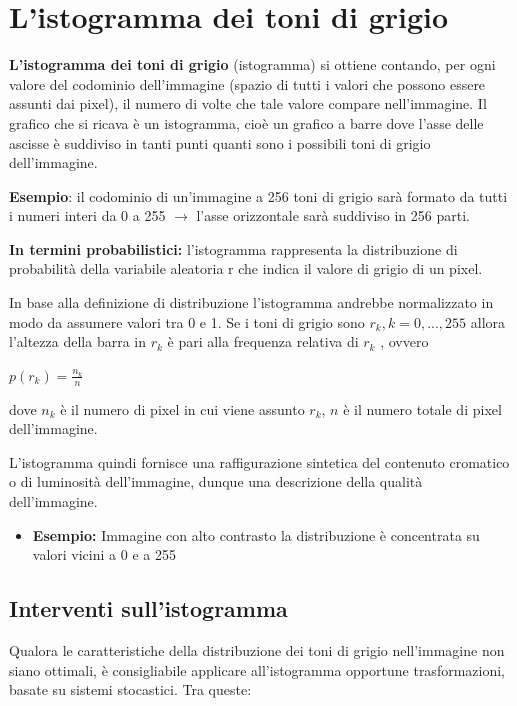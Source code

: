 \section{L’istogramma dei toni di grigio}

\textbf{L’istogramma dei toni di grigio} (istogramma) si ottiene contando, per ogni valore del codominio dell’immagine (spazio di tutti i valori
che possono essere assunti dai pixel), il numero di volte che tale valore compare nell’immagine.
Il grafico che si ricava è un istogramma, cioè un grafico a barre dove l’asse delle ascisse è suddiviso in tanti punti quanti sono i
possibili toni di grigio dell’immagine.

\begin{trivlist}
    \item \textbf{Esempio}: il codominio di un’immagine a 256 toni di grigio sarà formato da tutti i numeri interi da 0 a 255 $\rightarrow$ l’asse orizzontale sarà suddiviso in 256 parti.
\end{trivlist}

\textbf{In termini probabilistici:} l’istogramma rappresenta la distribuzione di probabilità della variabile aleatoria r che indica il
valore di grigio di un pixel.

\begin{definition}
    In base alla definizione di distribuzione l’istogramma andrebbe normalizzato in modo da assumere valori tra 0 e 1.
    Se i toni di grigio sono $r_k, k = 0, . . . , 255$ allora l’altezza della barra in $r_k$ è pari alla frequenza relativa di $r_k$ , ovvero
    \begin{center}
        $p(r_k) = \frac{n_k}{n}$
    \end{center}
    dove $n_k$ è il numero di pixel in cui viene assunto $r_k$, $n$ è il numero totale di pixel dell'immagine.
\end{definition}

L’istogramma quindi fornisce una raffigurazione sintetica del contenuto cromatico o di luminosità dell’immagine, dunque una descrizione
della qualità dell’immagine.

\begin{itemize}
    \item \textbf{Esempio:} Immagine con alto contrasto la distribuzione è concentrata su valori vicini a 0 e a 255
\end{itemize}


\subsection{Interventi sull’istogramma}
Qualora le caratteristiche della distribuzione dei toni di grigio nell’immagine non siano ottimali, è consigliabile applicare
all’istogramma opportune trasformazioni, basate su sistemi stocastici.
Tra queste:

